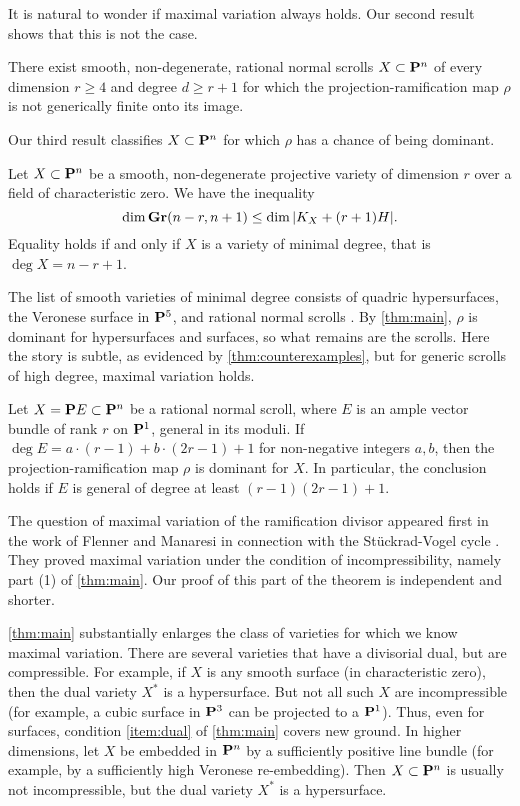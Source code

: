 It is natural to wonder if maximal variation always holds.
Our second result shows that this is not the case.
\begin{maintheorem}
  \label{thm:counterexamples}
  There exist smooth, non-degenerate, rational normal scrolls $X \subset \P^{n}$ of every dimension $r \geq 4$ and degree $d \geq r+1$ for which the projection-ramification map $\rho$ is not generically finite onto its image.
\end{maintheorem}
Our third result classifies $X \subset \P^n$ for which $\rho$ has a chance of being dominant.
\begin{maintheorem}
  \label{thm:minimaldegree}
  Let $X \subset \P^{n}$ be a smooth, non-degenerate projective variety of dimension $r$ over a field of characteristic zero.
  We have the inequality
  \[ \dim \Gr(n-r, n+1) \leq \dim |K_X + (r+1)H|.\]
  Equality holds if and only if $X$ is a variety of minimal degree, that is $\deg X = n-r+1$.
\end{maintheorem}
The list of smooth varieties of minimal degree consists of quadric hypersurfaces, the Veronese surface in $\P^5$, and rational normal scrolls \cite[Theorem~19.9]{har:95}.
By \autoref{thm:main}, $\rho$ is dominant for hypersurfaces and surfaces, so what remains are the scrolls.
Here the story is subtle, as evidenced by \autoref{thm:counterexamples}, but for generic scrolls of high degree, maximal variation holds.
\begin{maintheorem}
  \label{thm:rationalnormalscrolls}
  Let $X = \P E \subset \P^n$ be a rational normal scroll, where $E$ is an ample vector bundle of rank $r$ on $\P^1$, general in its moduli.
  If $\deg E = a \cdot (r-1) + b \cdot (2r-1) + 1$ for non-negative integers $a, b$, then the projection-ramification map $\rho$ is dominant for $X$.
  In particular, the conclusion holds if $E$ is general of degree at least $(r-1)(2r-1) + 1$.
\end{maintheorem}

The question of maximal variation of the ramification divisor appeared first in the work of Flenner and Manaresi in connection with the St\"uckrad-Vogel cycle \cite{fle.man:98}. 
They proved maximal variation under the condition of incompressibility, namely part (1) of \autoref{thm:main}.
Our proof of this part of the theorem is independent and shorter.

\autoref{thm:main} substantially enlarges the class of varieties for which we know maximal variation.
There are several varieties that have a divisorial dual, but are compressible.
For example, if $X$ is any smooth surface (in characteristic zero), then the dual variety $X^*$ is a hypersurface.
But not all such $X$ are incompressible (for example, a cubic surface in $\P^3$ can be projected to a $\P^1$).
Thus, even for surfaces, condition \eqref{item:dual} of \autoref{thm:main} covers new ground.
In higher dimensions, let $X$ be embedded in $\P^n$ by a sufficiently positive line bundle (for example, by a sufficiently high Veronese re-embedding).
Then $X \subset \P^n$ is usually not incompressible, but the dual variety $X^*$ is a hypersurface.

